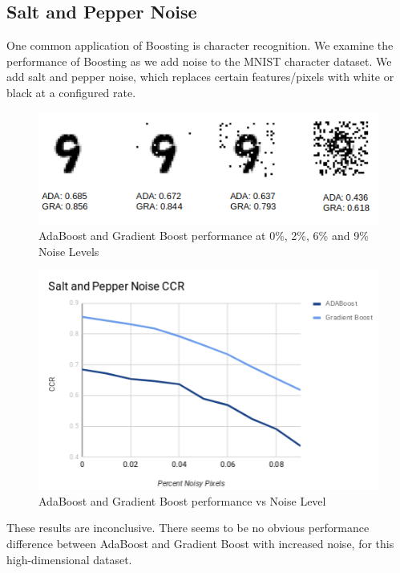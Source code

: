 \documentclass[10pt,twocolumn,letterpaper]{article}
\begin{document}
\subsection{Salt and Pepper Noise}
One common application of Boosting is character recognition. We examine the performance of Boosting as we add noise to the MNIST character dataset. We add salt and pepper noise, which replaces certain features/pixels with white or black at a configured rate.
\begin{figure}[h!]
  \includegraphics[width=\linewidth]{fig1.png}
  \caption{AdaBoost and Gradient Boost performance at 0\%, 2\%, 6\% and 9\% Noise Levels}
  \label{fig:c1}
\end{figure}
\begin{figure}[h!]
  \includegraphics[width=\linewidth]{fig2.png}
  \caption{AdaBoost and Gradient Boost performance vs Noise Level}
  \label{fig:c2}
\end{figure}
These results are inconclusive. There seems to be no obvious performance difference between AdaBoost and Gradient Boost with increased noise, for this high-dimensional dataset.  
\end{document}
